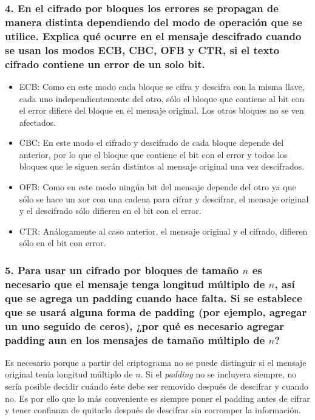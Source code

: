 \documentclass[12pt]{article}
\begin{document}
\subsubsection*{4. En el cifrado por bloques los errores se propagan de manera distinta dependiendo del modo de operación que se utilice. Explica qué ocurre en el mensaje descifrado cuando se usan los modos ECB, CBC, OFB y CTR, si el texto cifrado contiene un error de un solo bit.}
\begin{itemize}
\item ECB: Como en este modo cada bloque se cifra y descifra con la misma llave, cada uno independientemente del otro, sólo el bloque que contiene al bit con el error difiere del bloque en el mensaje original. Los otros bloques no se ven afectados.
\item CBC: En este modo el cifrado y descifrado de cada bloque depende del anterior, por lo que el bloque que contiene el bit con el error y todos los bloques que le siguen serán distintos al mensaje original una vez descifrados.
\item OFB: Como en este modo ningún bit del mensaje depende del otro ya que sólo se hace un xor con una cadena para cifrar y descifrar, el mensaje original y el descifrado sólo difieren en el bit con el error.
\item CTR: Análogamente al caso anterior, el mensaje original y el cifrado, difieren sólo en el bit con error.
\end{itemize}

\subsubsection*{5. Para usar un cifrado por bloques de tamaño $n$ es necesario que el mensaje tenga longitud múltiplo de $n$, así que se agrega un padding cuando hace falta. Si se establece que se usará alguna forma de padding (por ejemplo, agregar un uno seguido de ceros), ¿por qué es necesario agregar padding aun en los mensajes de tamaño múltiplo de $n$?}
Es necesario porque a partir del criptograma no se puede distinguir si el mensaje original tenía longitud múltiplo de $n$. Si el \textit{padding} no se incluyera siempre, no sería posible decidir cuándo éste debe ser removido después de descifrar y cuando no. Es por ello que lo más conveniente es siempre poner el padding antes de cifrar y tener confianza de quitarlo después de descifrar sin corromper la información.
\end{document}
